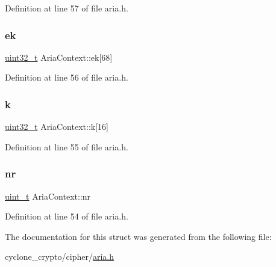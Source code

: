 Definition at line 57 of file aria.\+h.

\mbox{\label{structAriaContext_a4950c0459aaff6fbcb5b64161f4185bf}} 
\subsubsection{\texorpdfstring{ek}{ek}}
{\footnotesize\ttfamily \hyperlink{stdint_8h_a435d1572bf3f880d55459d9805097f62}{uint32\+\_\+t} Aria\+Context\+::ek\mbox{[}68\mbox{]}}



Definition at line 56 of file aria.\+h.

\mbox{\label{structAriaContext_a0fe6702fab1850816badc2887de388a2}} 
\subsubsection{\texorpdfstring{k}{k}}
{\footnotesize\ttfamily \hyperlink{stdint_8h_a435d1572bf3f880d55459d9805097f62}{uint32\+\_\+t} Aria\+Context\+::k\mbox{[}16\mbox{]}}



Definition at line 55 of file aria.\+h.

\mbox{\label{structAriaContext_a268fb9eff01c611d5e52da435422a329}} 
\subsubsection{\texorpdfstring{nr}{nr}}
{\footnotesize\ttfamily \hyperlink{compiler__port_8h_a12a1e9b3ce141648783a82445d02b58d}{uint\+\_\+t} Aria\+Context\+::nr}



Definition at line 54 of file aria.\+h.



The documentation for this struct was generated from the following file\+:\begin{DoxyCompactItemize}
\item 
cyclone\+\_\+crypto/cipher/\hyperlink{aria_8h}{aria.\+h}\end{DoxyCompactItemize}

